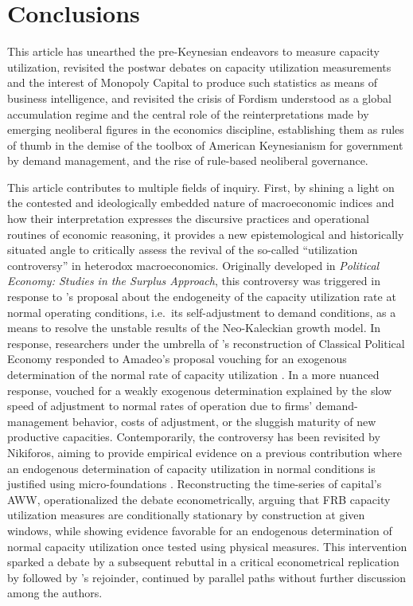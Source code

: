 \documentclass[11pt]{article}
\begin{document}
\section{Conclusions}

This article has unearthed the pre-Keynesian endeavors to measure capacity utilization, revisited the postwar debates on capacity utilization measurements and the interest of Monopoly Capital to produce such statistics as means of business intelligence, and revisited the crisis of Fordism understood as a global accumulation regime and the central role of the reinterpretations made by emerging neoliberal figures in the economics discipline, establishing them as rules of thumb in the demise of the toolbox of American Keynesianism for government by demand management, and the rise of rule-based neoliberal governance.

This article contributes to multiple fields of inquiry. First, by shining a light on the contested and ideologically embedded nature of macroeconomic indices and how their interpretation expresses the discursive practices and operational routines of economic reasoning, it provides a new epistemological and historically situated angle to critically assess the revival of the so-called ``utilization controversy'' in heterodox macroeconomics. Originally developed in \emph{Political Economy: Studies in the Surplus Approach}, this controversy was triggered in response to \citet{amadeo1986}'s proposal about the endogeneity of the capacity utilization rate at normal operating conditions, i.e.\ its self-adjustment to demand conditions, as a means to resolve the unstable results of the Neo-Kaleckian growth model. In response, researchers under the umbrella of \citet{sraffa1960}'s reconstruction of Classical Political Economy responded to Amadeo's proposal vouching for an exogenous determination of the normal rate of capacity utilization \citep{kurz1986}. In a more nuanced response, \citet{ciccone1986} vouched for a weakly exogenous determination explained by the slow speed of adjustment to normal rates of operation due to firms' demand-management behavior, costs of adjustment, or the sluggish maturity of new productive capacities. Contemporarily, the controversy has been revisited by Nikiforos, aiming to provide empirical evidence on a previous contribution where an endogenous determination of capacity utilization in normal conditions is justified using micro-foundations \citep{nikiforos2013}. Reconstructing the time-series of capital's AWW, \citet{nikiforos2016} operationalized the debate econometrically, arguing that FRB capacity utilization measures are conditionally stationary by construction at given windows, while showing evidence favorable for an endogenous determination of normal capacity utilization once tested using physical measures. This intervention sparked a debate by a subsequent rebuttal in a critical econometrical replication by \citet{gahnGonzalez2020} followed by \citet{nikiforos2020}'s rejoinder, continued by parallel paths without further discussion among the authors.
\end{document}
